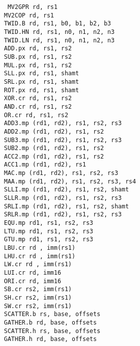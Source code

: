 {\tt
MV2GPR      rd, rs1                 \\
MV2COP      rd, rs1                 \\
TWID.B      rd, rs1, b0, b1, b2, b3 \\
TWID.HN     rd, rs1, n0, n1, n2, n3 \\
TWID.LN     rd, rs1, n0, n1, n2, n3 \\
ADD.px      rd, rs1, rs2            \\
SUB.px      rd, rs1, rs2            \\
MUL.px      rd, rs1, rs2            \\
SLL.px      rd, rs1, shamt          \\
SRL.px      rd, rs1, shamt          \\
ROT.px      rd, rs1, shamt          \\
XOR.cr      rd, rs1, rs2            \\
AND.cr      rd, rs1, rs2            \\
OR.cr       rd, rs1, rs2            \\
ADD3.mp     (rd1, rd2),  rs1, rs2, rs3 \\
ADD2.mp     (rd1, rd2),  rs1, rs2  \\
SUB3.mp     (rd1, rd2),  rs1, rs2, rs3 \\
SUB2.mp     (rd1, rd2),  rs1, rs2  \\
ACC2.mp     (rd1, rd2),  rs1, rs2  \\
ACC1.mp     (rd1, rd2),  rs1       \\
MAC.mp      (rd1, rd2),  rs1, rs2, rs3 \\
MAA.mp      (rd1, rd2),  rs1, rs2, rs3, rs4 \\
SLLI.mp     (rd1, rd2),  rs1, rs2, shamt \\
SLLR.mp     (rd1, rd2),  rs1, rs2, rs3 \\
SRLI.mp     (rd1, rd2),  rs1, rs2, shamt \\
SRLR.mp     (rd1, rd2),  rs1, rs2, rs3 \\
EQU.mp      rd1,         rs1, rs2, rs3 \\
LTU.mp      rd1,         rs1, rs2, rs3 \\
GTU.mp      rd1,         rs1, rs2, rs3 \\
LBU.cr      rd , imm(rs1)           \\
LHU.cr      rd , imm(rs1)           \\
LW.cr       rd , imm(rs1)           \\
LUI.cr      rd,  imm16              \\
ORI.cr      rd,  imm16              \\
SB.cr       rs2, imm(rs1)           \\
SH.cr       rs2, imm(rs1)           \\
SW.cr       rs2, imm(rs1)           \\
SCATTER.b   rs, base, offsets       \\
GATHER.b    rd, base, offsets       \\
SCATTER.h   rs, base, offsets       \\
GATHER.h    rd, base, offsets       \\
}


